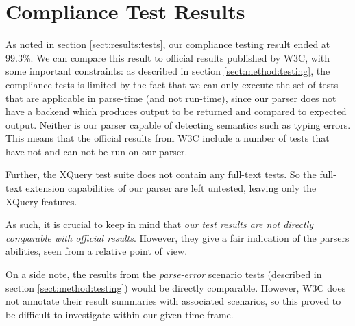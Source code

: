 \section{Compliance Test Results}
\label{sect:discussion:coverageResults}
As noted in section \ref{sect:results:tests}, our compliance testing result ended
at 99.3\%. We can compare this result to official results published by W3C, with
some  important constraints: as described in section \ref{sect:method:testing},
the compliance tests is limited by the fact that we can only execute the set of
tests that are applicable in parse-time (and not run-time), since our parser
does not have a backend which produces output to be returned and compared to
expected output. Neither is our parser capable of detecting semantics such as
typing errors. This means that the official results from W3C include a number
of tests that have not and can not be run on our parser.

Further, the XQuery test suite does not contain any full-text tests. So the
full-text extension capabilities of our parser are left untested, leaving only the XQuery features.

As such, it is crucial to keep in mind that \emph{our test results are not directly
comparable with official results}. However, they give a fair indication of the
parsers abilities, seen from a relative point of view.

On a side note, the results from the \emph{parse-error} scenario tests
(described in  section \ref{sect:method:testing}) would be directly comparable.
However, W3C does not annotate their result summaries with associated scenarios,
so this proved to be difficult to investigate within our given time frame.

